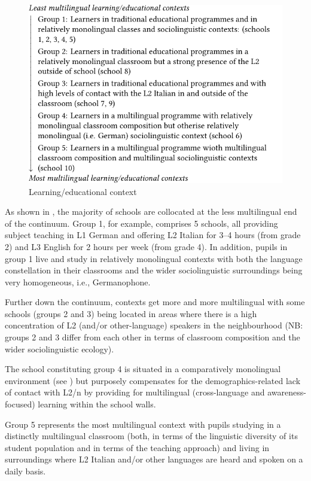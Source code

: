 \documentclass[output=paper]{../langscibook}
\begin{document}
\begin{figure}
        \includegraphics{figures/fig-7-1.pdf}
        \caption{Learning/educational context\label{fig:7:1}}
\end{figure}


As shown in , the majority of schools are collocated at the less multilingual end of the continuum. Group 1, for example, comprises 5 schools, all providing subject teaching in L1 German and offering L2 Italian for 3--4 hours (from grade 2) and L3 English for 2 hours per week (from grade 4). In addition, pupils in group 1 live and study in relatively monolingual contexts with both the language constellation in their classrooms and the wider sociolinguistic surroundings being very homogeneous, i.e., Germanophone. 

Further down the continuum, contexts get more and more multilingual with some schools (groups 2 and 3) being located in areas where there is a high concentration of L2 (and/or other-language) speakers in the neighbourhood (NB: groups 2 and 3 differ from each other in terms of classroom composition and the wider sociolinguistic ecology). 

The school constituting group 4 is situated in a comparatively monolingual environment (see ) but purposely compensates for the demographics-related lack of contact with L2/n by providing for multilingual (cross-language and awareness-focused) learning within the school walls. 

Group 5 represents the most multilingual context with pupils studying in a distinctly multilingual classroom (both, in terms of the linguistic diversity of its student population and in terms of the teaching approach) and living in surroundings where L2 Italian and/or other languages are heard and spoken on a daily basis.
\end{document}
